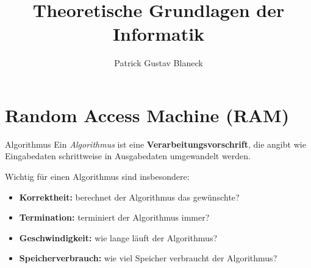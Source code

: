 \documentclass[german]{../spicker}
\title{Theoretische Grundlagen der Informatik}
\author{Patrick Gustav Blaneck}
\begin{document}
\maketitle
\tableofcontents
\newpage


\section{Random Access Machine (RAM)}

\begin{defi}{Algorithmus}
  Ein \emph{Algorithmus} ist eine \textbf{Verarbeitungsvorschrift}, die angibt wie Eingabedaten schrittweise in Ausgabedaten umgewandelt werden.

  Wichtig für einen Algorithmus sind insbesondere:
  \begin{itemize}
    \item \textbf{Korrektheit:} berechnet der Algorithmus das gewünschte?
    \item \textbf{Termination:} terminiert der Algorithmus immer?
    \item \textbf{Geschwindigkeit:} wie lange läuft der Algorithmus?
    \item \textbf{Speicherverbrauch:} wie viel Speicher verbraucht der Algorithmus?
  \end{itemize}
\end{defi}
\end{document}
